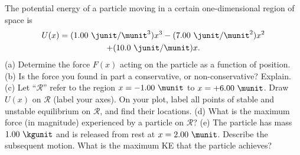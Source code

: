 The potential energy of a particle moving
in a certain one-dimensional region of space is
\begin{multline*}
  U(x) = (1.00\ \junit/\munit^3) x^3 - (7.00\ \junit/\munit^2) x^2 \\ + (10.0\ \junit/\munit) x.
\end{multline*}
%
(a) Determine the force $F(x)$ acting on the particle as a function of
position.\answercheck\hwendpart
%
(b) Is the force you found in part a conservative, or non-conservative?
Explain.
%
(c) Let ``$\mathcal{R}$'' refer to the region $x = -1.00\ \munit$
to $x= + 6.00\ \munit$.
Draw $U(x)$ on $\mathcal{R}$ (label your axes). On your plot,
label all points of stable and unstable equilibrium on $\mathcal{R}$,
and find their locations.
%
(d) What is the maximum force (in magnitude) experienced by a
particle on $\mathcal{R}$?\answercheck\hwendpart
%
(e) The particle has mass $1.00\ \kgunit$ and is released from rest at
$x=2.00\ \munit$. Describe the subsequent motion. What is the maximum
KE that the particle achieves?\answercheck
